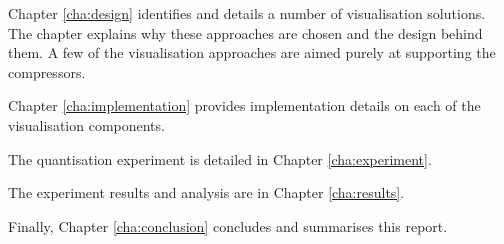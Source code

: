 Chapter \ref{cha:design} identifies and details a number of visualisation
solutions. The chapter explains why these approaches are chosen and the design
behind them. A few of the visualisation approaches are aimed purely at
supporting the compressors.

Chapter \ref{cha:implementation} provides implementation details on each of the
visualisation components.

The quantisation experiment is detailed in Chapter \ref{cha:experiment}.

The experiment results and analysis are in Chapter \ref{cha:results}.

Finally, Chapter \ref{cha:conclusion} concludes and summarises this report.



